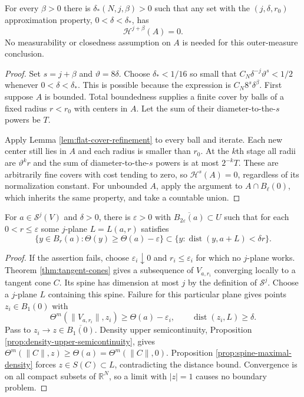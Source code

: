 \begin{proposition}\label{prop:flat-approximation-dimension}
For every $\beta>0$ there is $\delta_*(N,j,\beta)>0$ such that any set with the $(j,\delta,r_0)$ approximation property, $0<\delta<\delta_*$, has
\[
 \mathcal H^{j+\beta}(A)=0.
\]
No measurability or closedness assumption on $A$ is needed for this outer-measure conclusion.
\end{proposition}
\begin{proof}
Set $s=j+\beta$ and $\vartheta=8\delta$. Choose $\delta_*<1/16$ so small that
$C_N\delta^{-j}\vartheta^s<1/2$ whenever $0<\delta<\delta_*$. This is possible because the expression is $C_N8^s\delta^\beta$. First suppose $A$ is bounded. Total boundedness supplies a finite cover by balls of a fixed radius $r<r_0$ with centers in $A$. Let the sum of their diameter-to-the-$s$ powers be $T$.

Apply Lemma \ref{lem:flat-cover-refinement} to every ball and iterate. Each new center still lies in $A$ and each radius is smaller than $r_0$. At the $k$th stage all radii are $\vartheta^kr$ and the sum of diameter-to-the-$s$ powers is at most $2^{-k}T$. These are arbitrarily fine covers with cost tending to zero, so $\mathcal H^s(A)=0$, regardless of its normalization constant. For unbounded $A$, apply the argument to $A\cap B_\ell(0)$, which inherits the same property, and take a countable union.
\end{proof}

\begin{lemma}\label{lem:stratum-density-concentration}
For $a\in\mathcal S^j(V)$ and $\delta>0$, there is $\varepsilon>0$ with $\overline{B_{2\varepsilon}(a)}\subset U$ such that for each $0<r\leq\varepsilon$ some $j$-plane $L=L(a,r)$ satisfies
\[
 \{y\in B_r(a):\Theta(y)\geq\Theta(a)-\varepsilon\}
 \subset\{y:\operatorname{dist}(y,a+L)<\delta r\}.
\]
\end{lemma}
\begin{proof}
If the assertion fails, choose $\varepsilon_i\downarrow0$ and $r_i\leq\varepsilon_i$ for which no $j$-plane works. Theorem \ref{thm:tangent-cones} gives a subsequence of $V_{a,r_i}$ converging locally to a tangent cone $C$. Its spine has dimension at most $j$ by the definition of $\mathcal S^j$. Choose a $j$-plane $L$ containing this spine. Failure for this particular plane gives points $z_i\in B_1(0)$ with
\[
 \Theta^m(\|V_{a,r_i}\|,z_i)\geq\Theta(a)-\varepsilon_i,
 \qquad \operatorname{dist}(z_i,L)\geq\delta.
\]
Pass to $z_i\to z\in\overline{B_1(0)}$. Density upper semicontinuity, Proposition \ref{prop:density-upper-semicontinuity}, gives $\Theta^m(\|C\|,z)\geq\Theta(a)=\Theta^m(\|C\|,0)$. Proposition \ref{prop:spine-maximal-density} forces $z\in S(C)\subset L$, contradicting the distance bound. Convergence is on all compact subsets of $\mathbb R^N$, so a limit with $|z|=1$ causes no boundary problem.
\end{proof}

